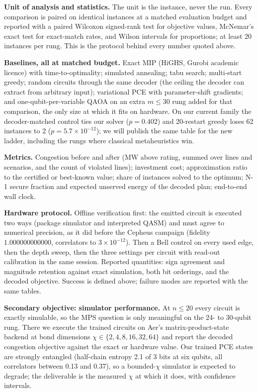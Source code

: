 \documentclass[10pt,a4paper]{article}
\begin{document}
\textbf{Unit of analysis and statistics.} The unit is the instance, never the
run. Every comparison is paired on identical instances at a matched
evaluation budget and reported with a paired Wilcoxon signed-rank test for
objective values, McNemar's exact test for exact-match rates, and Wilson
intervals for proportions; at least 20 instances per rung. This is the
protocol behind every number quoted above.

\textbf{Baselines, all at matched budget.} Exact MIP (HiGHS, Gurobi academic
licence) with time-to-optimality; simulated annealing; tabu search; multi-start
greedy; random circuits through the same decoder (the ceiling the decoder can
extract from arbitrary input); variational PCE with parameter-shift gradients;
and one-qubit-per-variable QAOA on an extra $m\le30$ rung added for that
comparison, the only size at which it fits on hardware. On our current family the decoder-matched control ties our solver
($p=0.402$) and 20-restart greedy loses 62 instances to 2
($p=5.7\times10^{-12}$); we will publish the same table for the new ladder,
including the rungs where classical metaheuristics win.

\textbf{Metrics.} Congestion before and after (MW above rating, summed over
lines and scenarios, and the count of violated lines); investment cost;
approximation ratio to the certified or best-known value; share of instances
solved to the optimum; N-1 secure fraction and expected unserved energy of the
decoded plan; end-to-end wall clock.

\textbf{Hardware protocol.} Offline verification first: the emitted circuit is
executed two ways (package simulator and interpreted QASM) and must agree to
numerical precision, as it did before the Cepheus campaign (fidelity
$1.000000000000$, correlators to $3\times10^{-12}$). Then a Bell control on
every used edge, then the depth sweep, then the three settings per circuit
with read-out calibration in the same session. Reported quantities: sign agreement
and magnitude retention against exact simulation, both bit orderings, and the
decoded objective. Success is defined above; failure modes are reported with
the same tables.

\textbf{Secondary objective: simulator performance.} At $n\le20$ every circuit
is exactly simulable, so the MPS question is only meaningful on the 24- to
30-qubit rung. There we execute the trained circuits on Aer's
matrix-product-state backend at bond dimensions $\chi\in\{2,4,8,16,32,64\}$
and report the decoded congestion objective against the exact or hardware
value. Our trained PCE states are strongly entangled (half-chain entropy 2.1 of
3 bits at six qubits, all correlators between 0.13 and 0.37), so a
bounded-$\chi$ simulator is expected to degrade; the deliverable is the
measured $\chi$ at which it does, with confidence intervals.
\end{document}
